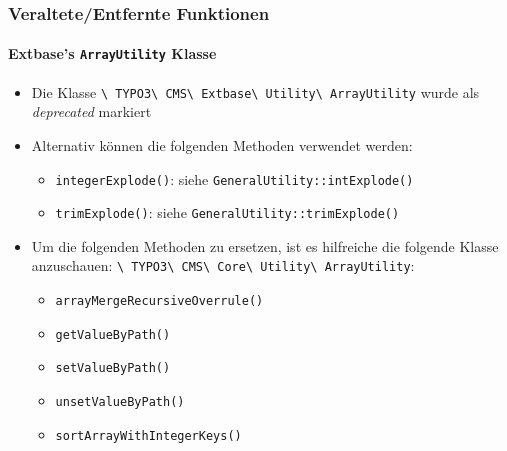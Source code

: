 \begin{frame}[fragile]
	\frametitle{Veraltete/Entfernte Funktionen}
	\framesubtitle{Extbase's \texttt{ArrayUtility} Klasse}

	\begin{itemize}
		\item Die Klasse
			\texttt{\textbackslash
				TYPO3\textbackslash
				CMS\textbackslash
				Extbase\textbackslash
				Utility\textbackslash
				ArrayUtility} wurde als \textit{deprecated} markiert

		\item Alternativ können die folgenden Methoden verwendet werden:

			\begin{itemize}
				\item \texttt{integerExplode()}: siehe \texttt{GeneralUtility::intExplode()}
				\item \texttt{trimExplode()}: siehe \texttt{GeneralUtility::trimExplode()}
			\end{itemize}

		\item Um die folgenden Methoden zu ersetzen, ist es hilfreiche die folgende Klasse anzuschauen:
			\texttt{\textbackslash
				TYPO3\textbackslash
				CMS\textbackslash
				Core\textbackslash
				Utility\textbackslash
				ArrayUtility}:

			\begin{itemize}
				\item \texttt{arrayMergeRecursiveOverrule()}
				\item \texttt{getValueByPath()}
				\item \texttt{setValueByPath()}
				\item \texttt{unsetValueByPath()}
				\item \texttt{sortArrayWithIntegerKeys()}
			\end{itemize}

	\end{itemize}

\end{frame}




